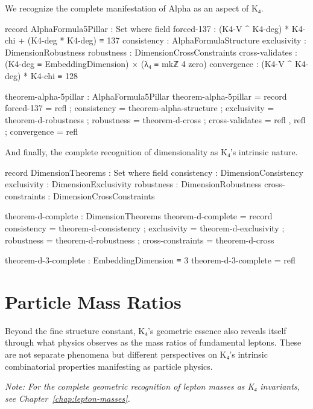 \documentclass[11pt,a4paper]{book}
\begin{document}
We recognize the complete manifestation of Alpha as an aspect of K₄.

\begin{code}
record AlphaFormula5Pillar : Set where
  field
    forced-137 : (K4-V ^ K4-deg) * K4-chi + (K4-deg * K4-deg) ≡ 137
    consistency     : AlphaFormulaStructure
    exclusivity     : DimensionRobustness
    robustness      : DimensionCrossConstraints
    cross-validates : (K4-deg ≡ EmbeddingDimension) × (λ₄ ≡ mkℤ 4 zero)
    convergence     : (K4-V ^ K4-deg) * K4-chi ≡ 128

theorem-alpha-5pillar : AlphaFormula5Pillar
theorem-alpha-5pillar = record
  { forced-137      = refl
  ; consistency     = theorem-alpha-structure
  ; exclusivity     = theorem-d-robustness
  ; robustness      = theorem-d-cross
  ; cross-validates = refl , refl
  ; convergence     = refl
  }
\end{code}

And finally, the complete recognition of dimensionality as K₄'s intrinsic nature.

\begin{code}
record DimensionTheorems : Set where
  field
    consistency       : DimensionConsistency
    exclusivity       : DimensionExclusivity
    robustness        : DimensionRobustness
    cross-constraints : DimensionCrossConstraints

theorem-d-complete : DimensionTheorems
theorem-d-complete = record
  { consistency       = theorem-d-consistency
  ; exclusivity       = theorem-d-exclusivity
  ; robustness        = theorem-d-robustness
  ; cross-constraints = theorem-d-cross
  }

theorem-d-3-complete : EmbeddingDimension ≡ 3
theorem-d-3-complete = refl
\end{code}

\section{Particle Mass Ratios}
\label{sec:mass-ratios-intro}

Beyond the fine structure constant, K₄'s geometric essence also reveals itself through what physics observes as the mass ratios of fundamental leptons. These are not separate phenomena but different perspectives on K₄'s intrinsic combinatorial properties manifesting as particle physics.

\medskip
\noindent\textit{Note: For the complete geometric recognition of lepton masses as K₄ invariants, see Chapter~\ref{chap:lepton-masses}.}
\end{document}
